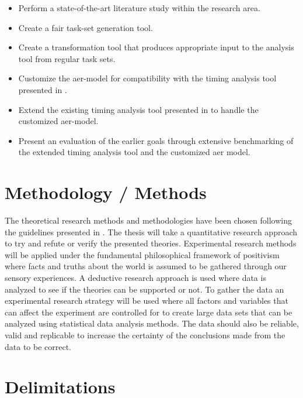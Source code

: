 \documentclass{kththesis}
\begin{document}
\begin{itemize}
    \item Perform a state-of-the-art literature study within the research area.
    \item Create a fair task-set generation tool.
    \item Create a transformation tool that produces appropriate input to the analysis tool from
        regular task sets.
    \item Customize the \acrshort{aer}-model for compatibility with the timing analysis tool
        presented in \parencite{nasri_exact_2017}.
    \item Extend the existing timing analysis tool presented in \parencite{nasri_exact_2017} to
        handle the customized \acrshort{aer}-model.
    \item Present an evaluation of the earlier goals through extensive benchmarking of the
        extended timing analysis tool and the customized \acrshort{aer} model.
\end{itemize}


\section{Methodology / Methods}

The theoretical research methods and methodologies have been chosen following the guidelines
presented in \textcite{hakansson_portal_2013}. The thesis will take a quantitative research approach
to try and refute or verify the presented theories. Experimental research methods will be applied
under the fundamental philosophical framework of positivism where facts and truths about the world
is assumed to be gathered through our sensory experiences. A deductive research approach is used
where data is analyzed to see if the theories can be supported or not. To gather the data an
experimental research strategy will be used where all factors and variables that can affect the
experiment are controlled for to create large data sets that can be analyzed using statistical data
analysis methods. The data should also be reliable, valid and replicable to increase the certainty
of the conclusions made from the data to be correct.


\section{Delimitations}
\end{document}
